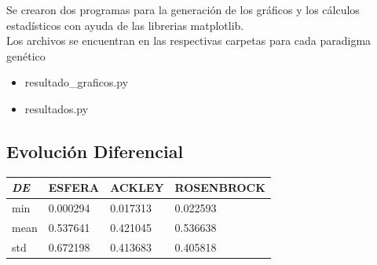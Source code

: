 \documentclass{article}
\begin{document}
Se crearon dos programas para la generación de los gráficos y los cálculos estadísticos con ayuda de las librerias matplotlib.\\
Los archivos se encuentran en las respectivas carpetas para cada paradigma genético

\begin{itemize}
\item resultado\_graficos.py
\item resultados.py
\end{itemize}

\subsection{Evolución Diferencial}
\begin{table}[H]
  \centering
  \begin{tabular}{|l|l|l|l|}
    \hline
        {\textit{\textbf{DE}}} & ESFERA   & ACKLEY   & ROSENBROCK \\ \hline
        min                        & 0.000294 & 0.017313 & 0.022593   \\ \hline
        mean                       & 0.537641 & 0.421045 & 0.536638   \\ \hline
        std                        & 0.672198 & 0.413683 & 0.405818   \\ \hline
  \end{tabular}
\end{table}
\end{document}
